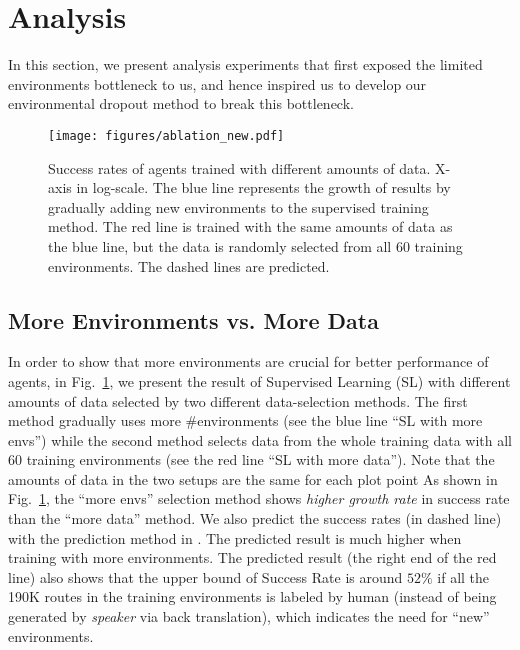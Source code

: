 \documentclass[11pt,a4paper]{article}
\begin{document}
\section{Analysis}
\label{sec:analysis}
In this section, we present analysis experiments that first exposed the limited environments bottleneck to us, and hence inspired us to develop our environmental dropout method to break this bottleneck.
\begin{figure}[t]
  \texttt{[image: figures/ablation\_new.pdf]} 
\caption{
Success rates of agents trained with different amounts of data. X-axis in log-scale.
The blue line represents the growth of results by gradually adding new environments to the supervised training method.
The red line is trained with the same amounts of data as the blue line, but the data is randomly selected from all $60$ training environments.
The dashed lines are predicted.
}
\label{fig:analysis}
\vspace{-10pt}
\end{figure}

\subsection{More Environments vs. More Data}
\label{sec:necessary}
In order to show that more environments are crucial for  better performance of agents, in Fig.~\ref{fig:analysis}, we present the result of Supervised Learning (SL) with different amounts of data selected by two different data-selection methods.
The first method gradually uses more \#environments (see the blue line ``SL with more envs'') while the second method selects data from the whole training data with all 60 training environments (see the red line ``SL with more data''). Note that the amounts of data in the two setups are the same for each plot point
As shown in Fig.~\ref{fig:analysis}, the ``more envs'' selection method shows \emph{higher growth rate} in success rate than the ``more data'' method. 
We also predict the success rates (in dashed line) with the prediction method in .
The predicted result is much higher when training with more environments.
The predicted result (the right end of the red line) also shows that the upper bound of Success Rate is around $52\%$ if all the 190K routes in the training environments is labeled by human (instead of being generated by \textit{speaker} via back translation), which indicates the need for ``new'' environments.
\end{document}
